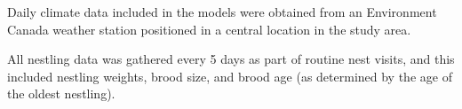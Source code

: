 
Daily climate data included in the models were obtained from an Environment Canada weather station positioned in a central location in the study area. 

All nestling data was gathered every 5 days as part of routine nest visits, and this included nestling weights, brood size, and brood age (as determined by the age of the oldest nestling).

